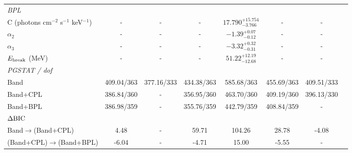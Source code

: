 \documentclass[twocolumn]{aastex631}
\begin{document}
\begin{table}
\begin{small}
\begin{center}
\begin{tabular}{p{4.5cm}ccccccc}
\multicolumn{1}{l}{\it BPL}\\
C (photons cm$^{-2}$ s$^{-1}$ keV$^{-1}$)               &-&-& - & $17.790_{-3.766}^{+15.754}$   & -  &- \\
$\alpha_2$                                          &-&-& - & $-1.39_{-0.12}^{+0.07}$    & -    & -  \\ 
$\alpha_3$                                          &-&-& - & $-3.32_{-0.31}^{+0.32}$    & -   &- \\ 
$E_{\rm{break}}$ (MeV)                              &-&-& - & $51.22_{-12.68}^{+12.19}$ & - &-  \\
\hline



\multicolumn{1}{l}{\it PGSTAT / dof  } \\
Band       &  409.04/363  & 377.16/333 & 434.38/363 &  585.68/363  &  455.69/363   &  409.51/333                   \\
Band+CPL   &  386.84/360  &     -      & 356.95/360 &  463.70/360  &  409.19/360   &  396.13/330                   \\
Band+BPL   &  386.98/359  &     -      & 355.76/359 &  442.79/359  &  408.84/359   &  -           &                \\
\hline
\multicolumn{1}{l}{\it $\Delta{\rm BIC}$}\\
Band$\rightarrow$(Band+CPL)  & 4.48 &-& 59.71  & 104.26   &  28.78  &   -4.08          \\
(Band+CPL)$\rightarrow$(Band+BPL)& -6.04 & -& -4.71&15.00   &  -5.55  &  -              \\
\hline \hline
\end{tabular}
\end{center}
\end{small}
\end{table}
\end{document}
